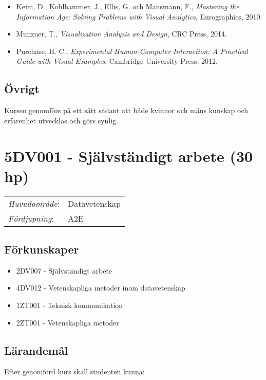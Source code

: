 \begin{itemize}
\tightlist
\item
  Keim, D., Kohlhammer, J., Ellis, G. och Mansmann, F., \emph{Mastering
  the Information Age: Solving Problems with Visual Analytics},
  Eurographics, 2010.
\item
  Munzner, T., \emph{Visualization Analysis and Design}, CRC Press,
  2014.
\item
  Purchase, H. C., \emph{Experimental Human-Computer Interaction: A
  Practical Guide with Visual Examples}, Cambridge University Press,
  2012.
\end{itemize}

\subsection*{Övrigt}

Kursen genomförs på ett sätt sådant att både kvinnor och mäns kunskap och erfarenhet utvecklas och görs synlig.
\pagebreak
\section*{5DV001 - Självständigt arbete (30 hp)}

\begin{tabular}{ll}\emph{Huvudområde}: & Datavetenskap\tabularnewline\emph{Fördjupning}: & A2E\tabularnewline\end{tabular}

\subsection*{Förkunskaper}

\begin{itemize}
\tightlist
\item
  2DV007 - Självständigt arbete
\item
  4DV012 - Vetenskapliga metoder inom datavetenskap
\item
  1ZT001 - Teknisk kommunikation
\item
  2ZT001 - Vetenskapliga metoder
\end{itemize}

\subsection*{Lärandemål}

Efter genomförd kurs skall studenten kunna:

